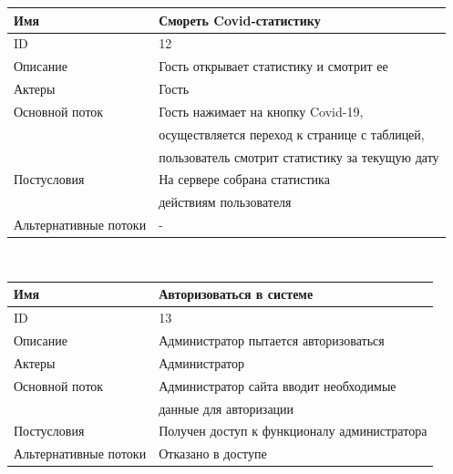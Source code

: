 \newpage
\BgThispage
\begin{center}
    \begin{tabular}{|l|l|}
        \hline
        Имя                   & Смореть Covid-статистику                        \\
        \hline
        ID                    & 12                                              \\
        \hline
        Описание              & Гость открывает статистику и смотрит ее         \\
        \hline
        Актеры                & Гость                                           \\
        \hline
        Основной поток        & Гость нажимает на кнопку Covid-19,              \\
        & осуществляется переход к странице с таблицей,   \\
        & пользователь смотрит статистику за текущую дату \\
        \hline
        Постусловия           & На сервере собрана статистика                   \\
        & действиям пользователя                          \\
        \hline
        Альтернативные потоки & -                                               \\
        \hline
    \end{tabular}\\
    \vspace{0.5cm}
    \begin{tabular}{|l|l|}
        \hline
        Имя                   & Авторизоваться в системе                    \\
        \hline
        ID                    & 13                                          \\
        \hline
        Описание              & Администратор пытается авторизоваться       \\
        \hline
        Актеры                & Администратор                               \\
        \hline
        Основной поток        & Администратор сайта вводит необходимые      \\
        & данные для авторизации                      \\
        \hline
        Постусловия           & Получен доступ к функционалу администратора \\
        \hline
        Альтернативные потоки & Отказано в доступе                          \\

\end{tabular}
\end{center}
